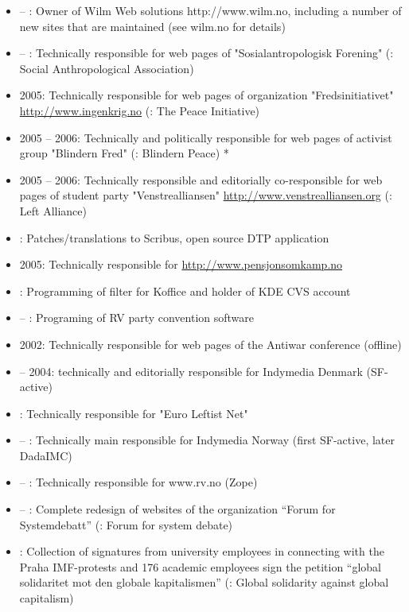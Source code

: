 \begin{itemize}
\item {} – : Owner of Wilm Web solutions http://www.wilm.no, including a number of new sites that are maintained (see wilm.no for details)
\item {} – : Technically responsible for web pages of "Sosialantropologisk Forening" (\english: Social Anthropological Association)
\item 2005: Technically responsible for web pages of organization "Fredsinitiativet" \href{http://www.ingenkrig.no}{http://www.ingenkrig.no} (\english: The Peace Initiative)
\item 2005 – 2006: Technically and politically responsible for web pages of activist group "Blindern Fred" (\english: Blindern Peace) *
\item 2005 – 2006: Technically responsible and editorially co-responsible for web pages of student party "Venstrealliansen" \href{http://www.venstrealliansen.org}{http://www.venstrealliansen.org} (\english: Left Alliance)
\item {}: Patches/translations to Scribus, open source DTP application
\item 2005: Technically responsible for \href{http://www.pensjonsomkamp.no}{http://www.pensjonsomkamp.no}
\item {}: Programming of filter for Koffice and holder of KDE CVS account
\item {} – : Programing of RV party convention software
\item 2002: Technically responsible for web pages of the Antiwar conference (offline)
\item {} – 2004: technically and editorially responsible for Indymedia Denmark (SF-active)
\item {}: Technically responsible for "Euro Leftist Net"
\item {} – : Technically main responsible for Indymedia Norway (first SF-active, later DadaIMC)
\item {} – : Technically responsible for www.rv.no (Zope)
\item \December – : Complete redesign of websites of the organization “Forum for Systemdebatt” (\english: Forum for system debate)
\item {}: Collection of signatures from university employees in connecting with the Praha IMF-protests and 176 academic employees sign the petition “global solidaritet mot den globale kapitalismen” (\english: Global solidarity against global capitalism)

\end{itemize}
